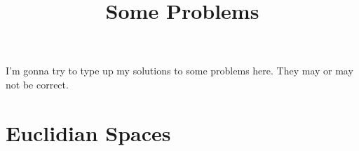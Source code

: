 \documentclass[fontsize=9pt]{article}
\title{Some Problems}
\date{}
\begin{document}
\maketitle
I'm gonna try to type up my solutions to some problems here. They may or may not be correct.
\tableofcontents
\section{Euclidian Spaces}
    
\end{document}
